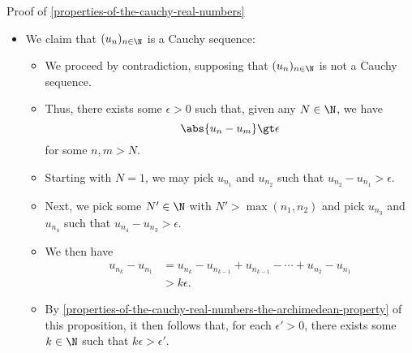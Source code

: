 \begin{Proof}{Proof of \cref{properties-of-the-cauchy-real-numbers}}
\begin{itemize}
\begin{itemize}
\begin{itemize}
                            \[
                                u_{n+1}%
                                \defeq%
                                (\ell_{n}+u_{n})/2,%
                            \]%
                            so we have
                            \begin{align*}
                                u_{n+1} &\defeq \frac{\ell_{n}+u_{n}}{2}\\
                                        &\leq   \frac{u_{n}+u_{n}}{2}\\
                                        &=      u_{n}.
                            \end{align*}
                        \item If $(\ell_{n}+u_{n})/2$ is not an upper bound of $S$, we have $u_{n+1}\defeq u_{n}$, so indeed $u_{n+1}\leq u_{n}$.
                    \end{itemize}
            \end{itemize}
        \item We claim that $(u_{n})_{n\in\N}$ is a Cauchy sequence:
            \begin{itemize}
                \item We proceed by contradiction, supposing that $(u_{n})_{n\in\N}$ is not a Cauchy sequence.
                \item Thus, there exists some $\epsilon\gt0$ such that, given any $N\in\N$, we have
                    \[
                        \abs{u_{n}-u_{m}}%
                        \gt%
                        \epsilon%
                    \]%
                    for some $n,m\gt N$.
                \item Starting with $N=1$, we may pick $u_{n_{1}}$ and $u_{n_{2}}$ such that $u_{n_{2}}-u_{n_{1}}\gt\epsilon$.
                \item Next, we pick some $N'\in\N$ with $N'\gt\max(n_{1},n_{2})$ and pick $u_{n_{3}}$ and $u_{n_{4}}$ such that $u_{n_{4}}-u_{n_{3}}\gt\epsilon$.
                \item We then have
                    \begin{align*}
                        u_{n_{k}}-u_{n_{1}} &=        u_{n_{k}}-u_{n_{k-1}}+u_{n_{k-1}}-\cdots+u_{n_{2}}-u_{n_{1}}\\
                                            &\gt k\epsilon.%
                    \end{align*}
                \item By \cref{properties-of-the-cauchy-real-numbers-the-archimedean-property} of this proposition, it then follows that, for each $\epsilon'\gt0$, there exists some $k\in\N$ such that $k\epsilon\gt\epsilon'$.

\end{itemize}
\end{itemize}
\end{Proof}
